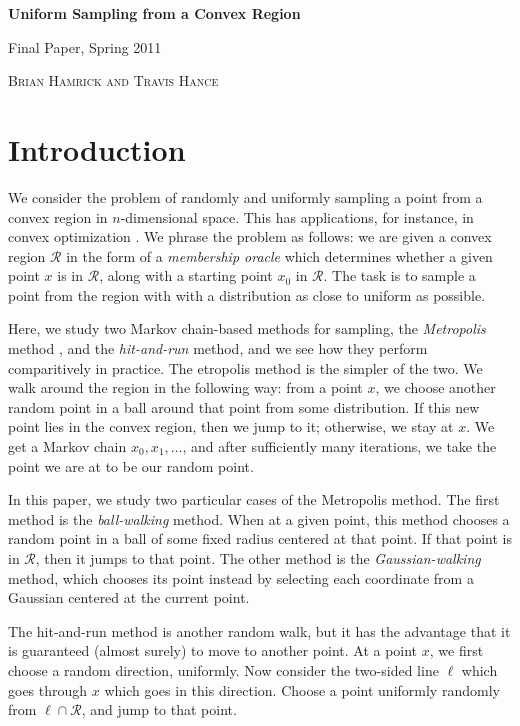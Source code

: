 \documentclass[11pt]{article}
\begin{document}
\begin{center} \begin{LARGE} {\sc \bf Uniform Sampling from a Convex Region} \vspace{6pt}

{ Final Paper, Spring 2011} \vspace{9pt}

\end{LARGE} { \Large \textsc{Brian Hamrick and Travis Hance}}

\end{center}

\section{Introduction}

We consider the problem of randomly and uniformly sampling a point from a convex region in $n$-dimensional space. This has applications, for instance, in convex optimization \cite{Dabbene}. We phrase the problem as follows: we are given a convex region $\mathcal{R}$ in the form of a \emph{membership oracle} which determines whether a given point $x$ is in $\mathcal{R}$, along with a starting point $x_0$ in $\mathcal{R}$. The task is to sample a point from the region with with a distribution as close to uniform as possible.

Here, we study two Markov chain-based methods for sampling, the \emph{Metropolis} method \cite{Metropolis}, and the \emph{hit-and-run} \cite{Vempala} method, and we see how they perform comparitively in practice. The etropolis method is the simpler of the two. We walk around the region in the following way: from a point $x$, we choose another random point in a ball around that point from some distribution. If this new point lies in the convex region, then we jump to it; otherwise, we stay at $x$. We get a Markov chain $x_0, x_1, ...$, and after sufficiently many iterations, we take the point we are at to be our random point.

In this paper, we study two particular cases of the Metropolis method. The first method is the \emph{ball-walking} method. When at a given point, this method chooses a random point in a ball of some fixed radius centered at that point. If that point is in $\mathcal{R}$, then it jumps to that point. The other method is the \emph{Gaussian-walking} method, which chooses its point instead by selecting each coordinate from a Gaussian centered at the current point.

The hit-and-run method is another random walk, but it has the advantage that it is guaranteed (almost surely) to move to another point. At a point $x$, we first choose a random direction, uniformly. Now consider the two-sided line $\ell$ which goes through $x$ which goes in this direction. Choose a point uniformly randomly from $\ell\cap\mathcal{R}$, and jump to that point.
\end{document}

